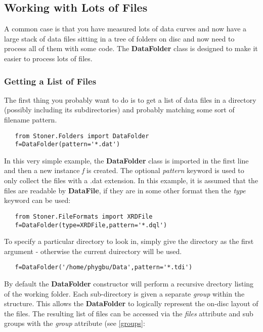 \documentclass[a4paper,11pt]{scrartcl}
\begin{document}
\subsection{Working with Lots of Files}\label{DataFolder}

A common case is that you have measured lots of data curves and now have a large stack of data files sitting in a tree of folders on disc and now need to process all of them with some code. The \textbf{DataFolder} class is designed to make it easier to process lots of files.

\subsubsection{Getting a List of Files}

The first thing you probably want to do is to get a list of data files in a directory (possibly including its subdirectories) and probably matching some sort of filename pattern.

\begin{lstlisting}
   from Stoner.Folders import DataFolder
   f=DataFolder(pattern='*.dat')
\end{lstlisting}

In this very simple example, the \textbf{DataFolder} class is imported in the first line and then a new instance \textit{f} is created. The optional \textit{pattern} keyword is used to only collect the files with a .dat extension. In this example, it is assumed that the files are readable by \textbf{DataFile}, if they are in some other format then the \textit{type} keyword can be used:

\begin{lstlisting}
   from Stoner.FileFormats import XRDFile
   f=DataFolder(type=XRDFile,pattern='*.dql')
\end{lstlisting}

To specify a particular directory to look in, simply give the directory as the first argument - otherwise the current duirectory will be used.

\begin{lstlisting}
   f=DataFolder('/home/phygbu/Data',pattern='*.tdi')
\end{lstlisting}

By default the \textbf{DataFolder} constructor will perform a recursive drectory listing of the working folder. Each sub-directory is given a separate \textit{group} within the structure. This allows the \textbf{DataFolder} to logically represent the on-disc layout of the files. The resulting list of files can be accessed via the \textit{files} attribute and sub groups with the \textit{group} attribute (see \ref{groups}:
\end{document}
